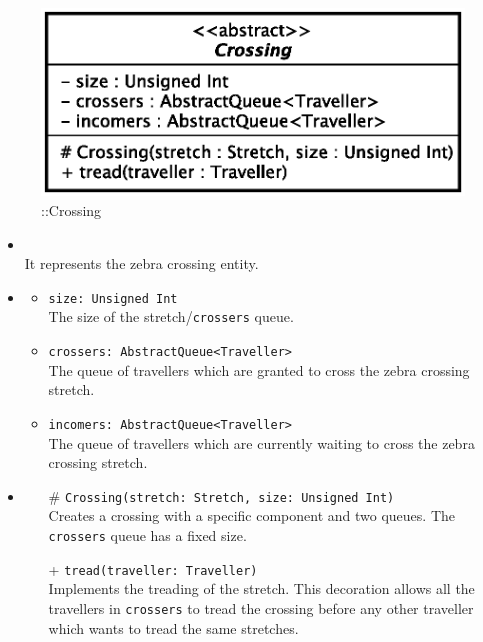 \begin{figure}[h]
\centering
\includegraphics[scale=0.6,keepaspectratio]{images/solution/app/backend/crossing.eps}
\caption{\pReactiveComponentStretchDecoration::Crossing}
\label{fig:sd-app-crossing}
\end{figure}
\FloatBarrier
\begin{itemize}
  \item \textbf{\descr} \\
    It represents the zebra crossing entity. 
  \item \textbf{\attrs}
  \begin{itemize}
    \item \texttt{size: Unsigned Int} \\
The size of the stretch/\texttt{crossers} queue.
    \item \texttt{crossers: AbstractQueue<Traveller>} \\
The queue of travellers which are granted to cross the zebra crossing stretch.
  \item \texttt{incomers: AbstractQueue<Traveller>} \\
The queue of travellers which are currently waiting to cross the zebra crossing stretch.
  \end{itemize}
\item \textbf{\ops}
  \begin{itemize}
    \item[\#] \texttt{Crossing(stretch: Stretch, size: Unsigned Int)} \\
Creates a crossing with a specific component and two queues. The
\texttt{crossers} queue has a fixed size.
    \item[+] \texttt{tread(traveller: Traveller)} \\
Implements the treading of the stretch. This decoration allows all the
travellers in \texttt{crossers} to tread the crossing before any other traveller
which wants to tread the same stretches.
  \end{itemize}
\end{itemize}
